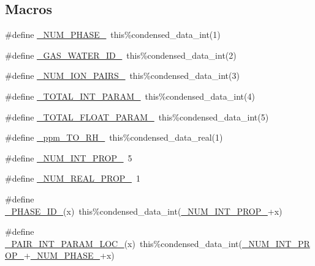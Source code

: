 \subsection*{Macros}
\begin{DoxyCompactItemize}
\item 
\#define \mbox{\hyperlink{rxn___p_d_fi_t_e__activity_8_f90_a98c0f2f4469a3e7669ed9b6a4428e562}{\+\_\+\+N\+U\+M\+\_\+\+P\+H\+A\+S\+E\+\_\+}}~this\%condensed\+\_\+data\+\_\+int(1)
\item 
\#define \mbox{\hyperlink{rxn___p_d_fi_t_e__activity_8_f90_a5e8b9e6b79dd9fd45c70418b6a17d326}{\+\_\+\+G\+A\+S\+\_\+\+W\+A\+T\+E\+R\+\_\+\+I\+D\+\_\+}}~this\%condensed\+\_\+data\+\_\+int(2)
\item 
\#define \mbox{\hyperlink{rxn___p_d_fi_t_e__activity_8_f90_afceac9fd991600a9e8cbf3827069efd1}{\+\_\+\+N\+U\+M\+\_\+\+I\+O\+N\+\_\+\+P\+A\+I\+R\+S\+\_\+}}~this\%condensed\+\_\+data\+\_\+int(3)
\item 
\#define \mbox{\hyperlink{rxn___p_d_fi_t_e__activity_8_f90_ab1d6092caf5b82884e8a4b7e90167d7e}{\+\_\+\+T\+O\+T\+A\+L\+\_\+\+I\+N\+T\+\_\+\+P\+A\+R\+A\+M\+\_\+}}~this\%condensed\+\_\+data\+\_\+int(4)
\item 
\#define \mbox{\hyperlink{rxn___p_d_fi_t_e__activity_8_f90_a689993e40ac640d6d3b9ca2801b7e496}{\+\_\+\+T\+O\+T\+A\+L\+\_\+\+F\+L\+O\+A\+T\+\_\+\+P\+A\+R\+A\+M\+\_\+}}~this\%condensed\+\_\+data\+\_\+int(5)
\item 
\#define \mbox{\hyperlink{rxn___p_d_fi_t_e__activity_8_f90_a2b1924d2f6c2ba6351856a2fa822ec91}{\+\_\+ppm\+\_\+\+T\+O\+\_\+\+R\+H\+\_\+}}~this\%condensed\+\_\+data\+\_\+real(1)
\item 
\#define \mbox{\hyperlink{rxn___p_d_fi_t_e__activity_8_f90_a54f7194dc6a244f7eb7a78f88b3362ba}{\+\_\+\+N\+U\+M\+\_\+\+I\+N\+T\+\_\+\+P\+R\+O\+P\+\_\+}}~5
\item 
\#define \mbox{\hyperlink{rxn___p_d_fi_t_e__activity_8_f90_a242fac7fe42c0d62936c65735dc023a6}{\+\_\+\+N\+U\+M\+\_\+\+R\+E\+A\+L\+\_\+\+P\+R\+O\+P\+\_\+}}~1
\item 
\#define \mbox{\hyperlink{rxn___p_d_fi_t_e__activity_8_f90_a14a34b71a2574b407c76579444eb9f63}{\+\_\+\+P\+H\+A\+S\+E\+\_\+\+I\+D\+\_\+}}(x)~this\%condensed\+\_\+data\+\_\+int(\mbox{\hyperlink{sub__model___u_n_i_f_a_c_8_f90_a54f7194dc6a244f7eb7a78f88b3362ba}{\+\_\+\+N\+U\+M\+\_\+\+I\+N\+T\+\_\+\+P\+R\+O\+P\+\_\+}}+x)
\item 
\#define \mbox{\hyperlink{rxn___p_d_fi_t_e__activity_8_f90_abbe1689f26b0329d94a96047259b5679}{\+\_\+\+P\+A\+I\+R\+\_\+\+I\+N\+T\+\_\+\+P\+A\+R\+A\+M\+\_\+\+L\+O\+C\+\_\+}}(x)~this\%condensed\+\_\+data\+\_\+int(\mbox{\hyperlink{sub__model___u_n_i_f_a_c_8_f90_a54f7194dc6a244f7eb7a78f88b3362ba}{\+\_\+\+N\+U\+M\+\_\+\+I\+N\+T\+\_\+\+P\+R\+O\+P\+\_\+}}+\mbox{\hyperlink{rxn___z_s_r__aerosol__water_8c_a98c0f2f4469a3e7669ed9b6a4428e562}{\+\_\+\+N\+U\+M\+\_\+\+P\+H\+A\+S\+E\+\_\+}}+x)

\end{DoxyCompactItemize}
